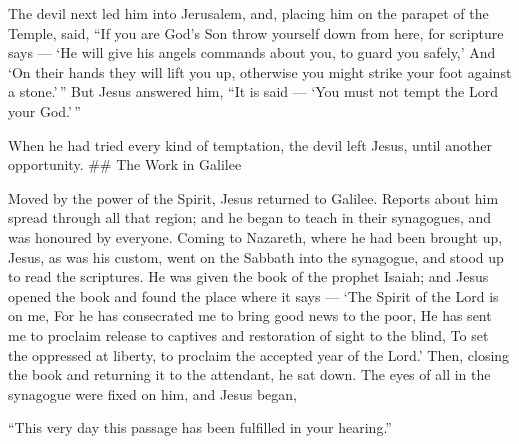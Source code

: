  The devil next led him into Jerusalem, and, placing him on
the parapet of the Temple, said, ``If you are God's Son throw yourself
down from here,  for scripture says --- `He will give his
angels commands about you, to guard you safely,'  And `On
their hands they will lift you up, otherwise you might strike your foot
against a stone.'\,''  But Jesus answered him, ``It is said
--- `You must not tempt the Lord your God.'\,''

 When he had tried every kind of temptation, the devil left
Jesus, until another opportunity. \#\# The Work in Galilee

 Moved by the power of the Spirit, Jesus returned to
Galilee. Reports about him spread through all that region; 
and he began to teach in their synagogues, and was honoured by everyone.
 Coming to Nazareth, where he had been brought up, Jesus,
as was his custom, went on the Sabbath into the synagogue, and stood up
to read the scriptures.  He was given the book of the
prophet Isaiah; and Jesus opened the book and found the place where it
says ---  `The Spirit of the Lord is on me, For he has
consecrated me to bring good news to the poor, He has sent me to
proclaim release to captives and restoration of sight to the blind, To
set the oppressed at liberty,  to proclaim the accepted
year of the Lord.'  Then, closing the book and returning it
to the attendant, he sat down. The eyes of all in the synagogue were
fixed on him,  and Jesus began,

``This very day this passage has been fulfilled in your hearing.''


